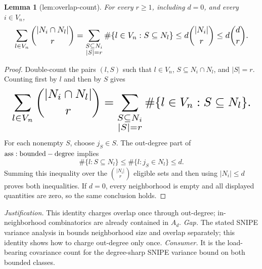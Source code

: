 \documentclass{article}
\newtheorem{lemma}{Lemma}
\begin{document}
\begin{lemma}[lem:overlap-count]\label{lem:overlap-count}
For every \(r\ge1\), including \(d=0\), and every \(i\in V_n\), \[
\makebox[\linewidth][c]{\resizebox{0.98\linewidth}{!}{\par\noindent \makebox[\linewidth][c]{\resizebox{0.98\linewidth}{!}{\(\displaystyle \displaystyle \sum_{l\in V_n}\binom{|N_i\cap N_l|}{r}=\sum_{\substack{S\subseteq N_i\\|S|=r}}\#\{l\in V_n:S\subseteq N_l\}\le d\binom{|N_i|}{r}\le d\binom{d}{r}.\)}}\par\noindent}}
\]
\end{lemma}
\begin{proof}
Double-count the pairs \((l,S)\) such that \(l\in V_n\), \(S\subseteq N_i\cap N_l\), and \(|S|=r\). Counting first by \(l\) and then by \(S\) gives
\[
\makebox[\linewidth][c]{\resizebox{0.98\linewidth}{!}{\(\displaystyle \sum_{l\in V_n}\binom{|N_i\cap N_l|}{r}
=\sum_{\substack{S\subseteq N_i\\|S|=r}}\#\{l\in V_n:S\subseteq N_l\}.\)}}
\]
For each nonempty \(S\), choose \(j_S\in S\). The out-degree part of \({\rm ass:bounded-degree}\) implies
\[
\#\{l:S\subseteq N_l\}\le\#\{l:j_S\in N_l\}\le d.
\]
Summing this inequality over the \(\binom{|N_i|}{r}\) eligible sets and then using \(|N_i|\le d\) proves both inequalities. If \(d=0\), every neighborhood is empty and all displayed quantities are zero, so the same conclusion holds.
\end{proof}
\par\smallskip\noindent \textit{Justification.} This identity charges overlap once through out-degree; in-neighborhood combinatorics are already contained in \(A_d\). \textit{Gap.} The stated SNIPE variance analysis in \cite{CortezRodriguezEichhornYu2023} bounds neighborhood size and overlap separately; this identity shows how to charge out-degree only once. \textit{Consumer.} It is the load-bearing covariance count for the degree-sharp SNIPE variance bound on both bounded classes.
\end{document}
